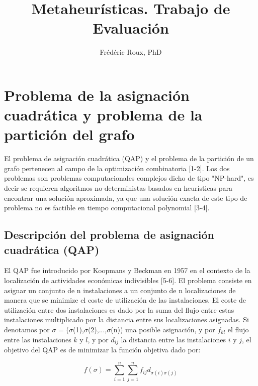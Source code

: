 \documentclass{article}
\begin{document}
 
 \title{Metaheurísticas. Trabajo de Evaluación}
\author{Frédéric Roux, PhD}

\maketitle
 
  \section{Problema de la asignación cuadrática y problema de la partición del grafo}
El problema de asignación cuadrática (QAP) y el problema de la partición de un grafo pertenecen al campo de la optimización combinatoria [1-2]. Los dos problemas son problemas computacionales complejos dicho de tipo "NP-hard", es decir se requieren algoritmos no-deterministas basados en heurísticas para encontrar una solución aproximada, ya que una solución exacta de este tipo de problema no es factible en tiempo computacional polynomial [3-4].

\subsection{Descripción del problema de asignación cuadrática (QAP) }
El QAP fue introducido por Koopmans y  Beckman en 1957 en el contexto de la localización de actividades económicas indivisibles [5-6]. El problema consiste en asignar un conjunto de n instalaciones a un conjunto de n localizaciones de manera que se minimize el coste de utilización de las instalaciones. El coste de utilización entre dos instalaciones es dado por la suma del flujo entre estas instalaciones multiplicado por la distancia entre sus localizaciones asignadas. Si denotamos por $\sigma$ = ($\sigma$(1),$\sigma$(2),...,$\sigma$(n)) una posible asignación, y por $f_{kl}$  el flujo entre las instalaciones $k$ y $l$, y por $d_{ij}$ la distancia entre las instalaciones $i$ y $j$, el objetivo del QAP es de minimizar la función objetiva dado por:\newline

 \begin{equation}
	f(\sigma)=\sum_{i=1}^{n}\sum_{j=1}^{n}f_{ij}d_{\sigma(i)\sigma(j)}
\end{equation}
\end{document}
